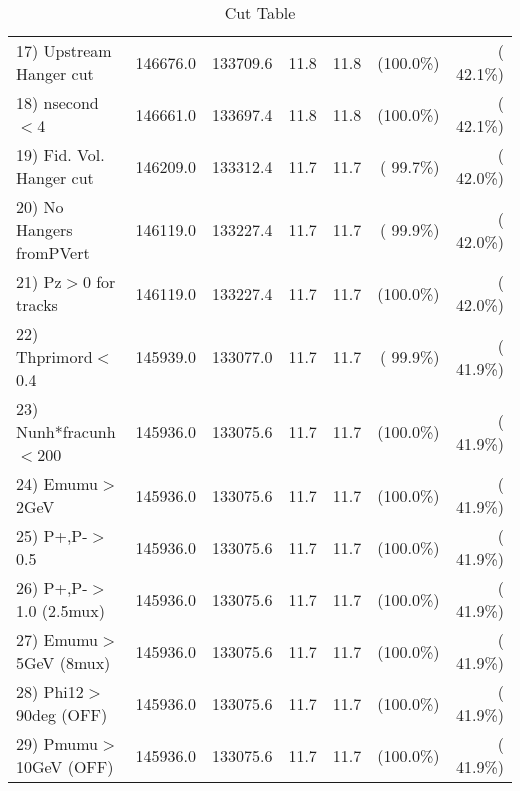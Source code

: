 \begin{table}[h!]
\begin{tabular}{||l||r|r|r|r|r|r||}
 17) Upstream Hanger cut  &     146676.0 &     133709.6 &         11.8 &         11.8 & (100.0\%) & ( 42.1\%) \\
 18) nsecond$<$4          &     146661.0 &     133697.4 &         11.8 &         11.8 & (100.0\%) & ( 42.1\%) \\
 19) Fid. Vol. Hanger cut &     146209.0 &     133312.4 &         11.7 &         11.7 & ( 99.7\%) & ( 42.0\%) \\
 20) No Hangers fromPVert &     146119.0 &     133227.4 &         11.7 &         11.7 & ( 99.9\%) & ( 42.0\%) \\
 21) Pz$>$0 for tracks    &     146119.0 &     133227.4 &         11.7 &         11.7 & (100.0\%) & ( 42.0\%) \\
 22) Thprimord$<$0.4      &     145939.0 &     133077.0 &         11.7 &         11.7 & ( 99.9\%) & ( 41.9\%) \\
 23) Nunh*fracunh$<$200   &     145936.0 &     133075.6 &         11.7 &         11.7 & (100.0\%) & ( 41.9\%) \\
 24) Emumu$>$2GeV         &     145936.0 &     133075.6 &         11.7 &         11.7 & (100.0\%) & ( 41.9\%) \\
 25) P+,P-$>$0.5          &     145936.0 &     133075.6 &         11.7 &         11.7 & (100.0\%) & ( 41.9\%) \\
 26) P+,P-$>$1.0 (2.5mux) &     145936.0 &     133075.6 &         11.7 &         11.7 & (100.0\%) & ( 41.9\%) \\
 27) Emumu$>$5GeV  (8mux) &     145936.0 &     133075.6 &         11.7 &         11.7 & (100.0\%) & ( 41.9\%) \\
 28) Phi12$>$90deg  (OFF) &     145936.0 &     133075.6 &         11.7 &         11.7 & (100.0\%) & ( 41.9\%) \\
 29) Pmumu$>$10GeV  (OFF) &     145936.0 &     133075.6 &         11.7 &         11.7 & (100.0\%) & ( 41.9\%) \\
 \hline
 \hline
 \end{tabular}
 \caption{Cut Table           }
 \label{tab-cutcohjpsi-mumu_jpsi}
 \end{table}
